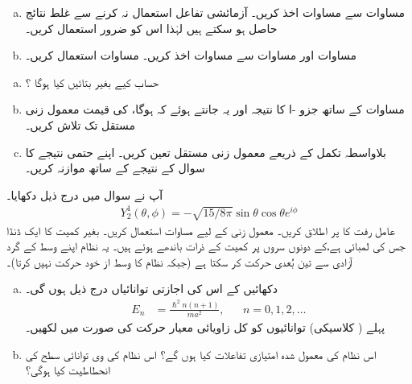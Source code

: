 \begin{enumerate}[a.]
\item
مساوات  سے مساوات  اخذ کریں۔ آزمائشی تفاعل استعمال نہ کرنے سے غلط نتائج حاصل ہو سکتے ہیں لہٰذا اس کو ضرور استعمال کریں۔ 
\item
مساوات  اور مساوات  سے مساوات  اخذ کریں۔  مساوات  استعمال کریں۔ 
\end{enumerate}
\begin{enumerate}[a.]
\item
حساب کیے بغیر بتائیں  کیا ہوگا ؟
\item
مساوات  کے ساتھ جزو -ا کا نتیجہ اور یہ جانتے ہوئے کہ  ہوگا،  کی قیمت معمول زنی مستقل تک تلاش کریں۔ 
\item
بلاواسطہ تکمل کے ذریعے معمول زنی مستقل تعین کریں۔ اپنے حتمی نتیجے کا سوال  کے نتیجے کے ساتھ موازنہ کریں۔ 
\end{enumerate} 
آپ نے سوال  میں درج ذیل دکھایا۔ 
\begin{align*} 
Y_2^1 (\theta , \phi) = - \sqrt{15/8 \pi} \sin \theta \cos \theta e^{i \phi}
\end{align*}
عامل رفت کا  پر اطلاق کریں۔ معمول زنی کے لیے مساوات  استعمال کریں۔ 
بغیر کمیت کا ایک ڈنڈا جس کی لمبائی  ہے،کے دونوں سروں پر کمیت  کے ذرات باندھے ہوئے ہیں۔ یہ نظام اپنے وسط کے گرد آزادی سے تین بُعدی حرکت کر سکتا ہے (جبکہ نظام کا وسط از خود حرکت نہیں کرتا)۔ 
\begin{enumerate}[a.]
\item
دکھائیں کے اس  کی اجازتی توانائیاں درج ذیل ہوں گی۔ 
\begin{align*}
E_n& = \frac{\hslash^2 n (n + 1)}{m a^2} ,&& n=0,1,2,\dotsc 
\end{align*}
 پہلے ( کلاسیکی) توانائیوں کو کل زاویائی معیار حرکت کی صورت میں لکھیں۔ 
\item
اس نظام کی معمول شدہ امتیازی تفاعلات کیا ہوں گے؟ اس نظام کی  وی توانائی سطح کی انحطاطیت کیا ہوگی؟ 
\end{enumerate}

